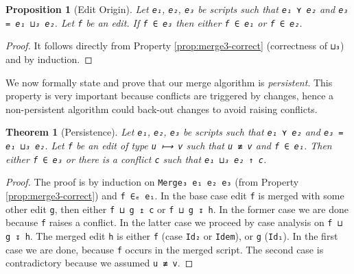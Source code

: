 \documentclass{sigplanconf}
\theoremstyle{plain}
\newtheorem{thm}{Theorem}
\newtheorem{prop}{Proposition}
\begin{document}
\begin{prop}[Edit Origin]
Let \texttt{e₁}, \texttt{e₂}, \texttt{e₃} be scripts such that
\texttt{e₁ ⋎ e₂} and \texttt{e₃ = e₁ ⊔₃ e₂}. Let \texttt{f} be an edit.
If \texttt{f ∈ e₃} then either \texttt{f ∈ e₁} or \texttt{f ∈ e₂}.
\end{prop}
\begin{proof}
  It follows directly from Property \ref{prop:merge3-correct}
  (correctness of \texttt{⊔₃}) and by induction.
\end{proof}

  We now formally state and prove that our merge algorithm is \emph{persistent}.
  This property is very important because conflicts are triggered by changes,
  hence a non-persistent algorithm could back-out changes to avoid raising
  conflicts.


				
\begin{thm}[Persistence]
Let \texttt{e₁}, \texttt{e₂}, \texttt{e₃} be scripts such that
\texttt{e₁ ⋎ e₂} and \texttt{e₃ = e₁ ⊔₃ e₂}. Let \texttt{f} be an edit
of type \texttt{u ⟼ v} such that \texttt{u ≢ v} and \texttt{f ∈ e₁}.
Then either \texttt{f ∈ e₃} or there is a conflict \texttt{c} such that
\texttt{e₁ ⊔₃ e₂ ↑ c}.
\end{thm}
\begin{proof}
  The proof is by induction on \texttt{Merge₃ e₁ e₂ e₃} (from Property
  \ref{prop:merge3-correct}) and \texttt{f ∈ₑ e₁}.
    In the base case edit \texttt{f} is merged with some other edit
    \texttt{g}, then either \texttt{f ⊔ g ↥ c} or \texttt{f ⊔ g ↧ h}.
    In the former case we are done because \texttt{f} raises a
    conflict.  In the latter case we proceed by case analysis on
    \texttt{f ⊔ g ↧ h}.
    The merged edit \texttt{h} is either \texttt{f} (case \texttt{Id₂}
    or \texttt{Idem}), or \texttt{g} (\texttt{Id₁}). In the first case
    we are done, because \texttt{f} occurs in the merged script.
    The second case is contradictory because we assumed \texttt{u ≢
      v}.
\end{proof}        
\end{document}
